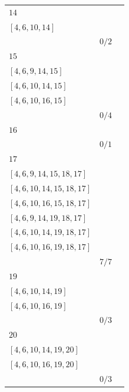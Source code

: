 \documentclass[12pt, a4paper]{extarticle}
\begin{document}
\begin{table}[h!]
\begin{tabularx}{\textwidth}{|X|X|X|}
        \hline
        $14$ & \begin{tabular}{@{}l@{}} $[4, 6, 9, 14]$ \\  $[4, 6, 10, 14]$ \\ \end{tabular} & $0/2$ \\
        \hline
        $15$ & \begin{tabular}{@{}l@{}} $[4, 6, 9, 13, 15]$ \\  $[4, 6, 9, 14, 15]$ \\  $[4, 6, 10, 14, 15]$ \\  $[4, 6, 10, 16, 15]$ \\ \end{tabular} & $0/4$ \\
        \hline
        $16$ & \begin{tabular}{@{}l@{}} $[4, 6, 10, 16]$ \\ \end{tabular} & $0/1$ \\
        \hline
        $17$ & \begin{tabular}{@{}l@{}} $[4, 6, 9, 13, 15, 18, 17]$ \\  $[4, 6, 9, 14, 15, 18, 17]$ \\  $[4, 6, 10, 14, 15, 18, 17]$ \\  $[4, 6, 10, 16, 15, 18, 17]$ \\  $[4, 6, 9, 14, 19, 18, 17]$ \\  $[4, 6, 10, 14, 19, 18, 17]$ \\  $[4, 6, 10, 16, 19, 18, 17]$ \\ \end{tabular} & $7/7$ \\
        \hline
        $19$ & \begin{tabular}{@{}l@{}} $[4, 6, 9, 14, 19]$ \\  $[4, 6, 10, 14, 19]$ \\  $[4, 6, 10, 16, 19]$ \\ \end{tabular} & $0/3$ \\
        \hline
        $20$ & \begin{tabular}{@{}l@{}} $[4, 6, 9, 14, 19, 20]$ \\  $[4, 6, 10, 14, 19, 20]$ \\  $[4, 6, 10, 16, 19, 20]$ \\ \end{tabular} & $0/3$ \\
        \hline
    \end{tabularx}
\end{table}
\end{document}
